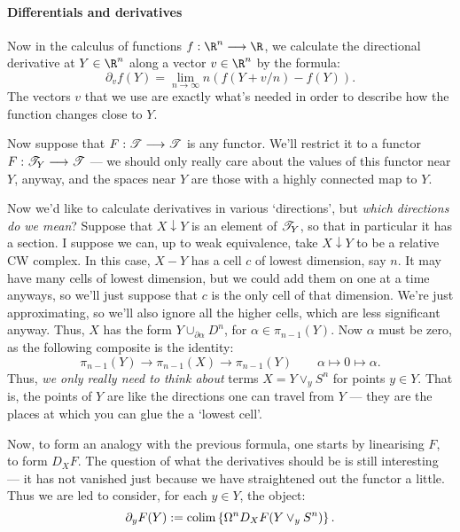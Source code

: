 \documentclass[11pt]{article}
\begin{document}
\begin{Note on derivatives}
\begin{shaded}
\paragraph*{Differentials and derivatives}
Now in the calculus of functions $f:\R^n\to \R$, we calculate the directional derivative at $Y\in\R^n$ along a vector $v\in\R^n$ by the formula:
\[\partial_vf(Y)=\lim_{n\rightarrow\infty} n\left(f(Y+v/n)-f(Y)\right).\]
The vectors $v$ that we use are exactly what's needed in order to describe how the function changes close to $Y$.

Now suppose that $F:\mathscr{T}\longrightarrow\mathscr{T}$ is any functor. We'll restrict it to a functor $F:\mathscr{T}_Y\longrightarrow\mathscr{T}$ --- we should only really care about the values of this functor near $Y$, anyway, and the spaces near $Y$ are those with a highly connected map to $Y$.

Now we'd like to calculate derivatives in various `directions', but \emph{which directions do we mean}? Suppose that $X\downarrow Y$ is an element of $\mathscr{T}_Y$, so that in particular it has a section. I suppose we can, up to weak equivalence, take $X\downarrow Y$ to be a relative CW complex. In this case, $X-Y$ has a cell $c$ of lowest dimension, say $n$. It may have many cells of lowest dimension, but we could add them on one at a time anyways, so we'll just suppose that $c$ is the only cell of that dimension. We're just approximating, so we'll also ignore all the higher cells, which are less significant anyway. Thus, $X$ has the form $Y\cup_{\partial \alpha}D^n$, for $\alpha\in\pi_{n-1}(Y)$. Now $\alpha$ must be zero, as the following composite is the identity:
\[\pi_{n-1}(Y)\to \pi_{n-1}(X)\to \pi_{n-1}(Y)\qquad \alpha\mapsto0\mapsto\alpha.\]
Thus, \emph{we only really need to think about} terms $X=Y\vee _yS^n$ for points $y\in Y$. That is, the points of $Y$ are like the directions one can travel from $Y$ --- they are the places at which you can glue the a `lowest cell'.

Now, to form an analogy with the previous formula, one starts by linearising $F$, to form $D_XF$. The question of what the derivatives should be is still interesting --- it has not vanished just because we have straightened out the functor a little. Thus we are led to consider, for each $y\in Y$, the object:
\[\partial_yF(Y):=\operatorname*{colim} \left\{\Omega^nD_XF(Y\vee _yS^n)\right\}.\]
%
%
%
%
%
\end{shaded}
\end{Note on derivatives}
\end{document}
